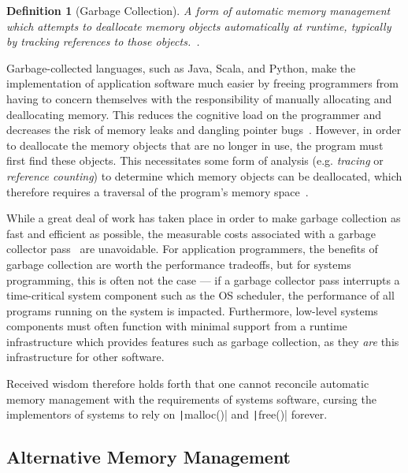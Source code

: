 \documentclass[11pt,draft]{article}
\theoremstyle{break}
\newtheorem{defn}{Definition}
\begin{document}
\begin{defn}[Garbage Collection]
A form of automatic memory management which attempts to deallocate memory objects automatically at runtime, typically by tracking references to those objects.~\cite{Bartley:2003:GC:1074100.1074419,Dijkstra:1978:OGC:359642.359655}.
\end{defn}

Garbage-collected languages, such as Java, Scala, and Python, make the implementation of application software much easier by freeing programmers from having to concern themselves with the responsibility of manually allocating and deallocating memory. This reduces the cognitive load on the programmer and decreases the risk of memory leaks and dangling pointer bugs~\cite{Hertz:2005:QPG:1094811.1094836,Dijkstra:1978:OGC:359642.359655}. However, in order to deallocate the memory objects that are no longer in use, the program must first find these objects. This necessitates some form of analysis (e.g. \textit{tracing} or \textit{reference counting}) to determine which memory objects can be deallocated, which therefore requires a traversal of the program's memory space~\cite{Hertz:2005:QPG:1094811.1094836,Dijkstra:1978:OGC:359642.359655,Bartley:2003:GC:1074100.1074419}.

While a great deal of work has taken place in order to make garbage collection as fast and efficient as possible, the measurable costs associated with a garbage collector pass~\cite{Hertz:2005:QPG:1094811.1094836} are unavoidable. For application programmers, the benefits of garbage collection are worth the performance tradeoffs, but for systems programming, this is often not the case --- if a garbage collector pass interrupts a time-critical system component such as the OS scheduler, the performance of all programs running on the system is impacted. Furthermore, low-level systems components must often function with minimal support from a runtime infrastructure which provides features such as garbage collection, as they \textit{are} this infrastructure for other software.

Received wisdom therefore holds forth that one cannot reconcile automatic memory management with the requirements of systems software, cursing the implementors of systems to rely on \texttt|malloc()| and \texttt|free()| forever.

\subsection{Alternative Memory Management}
\end{document}
